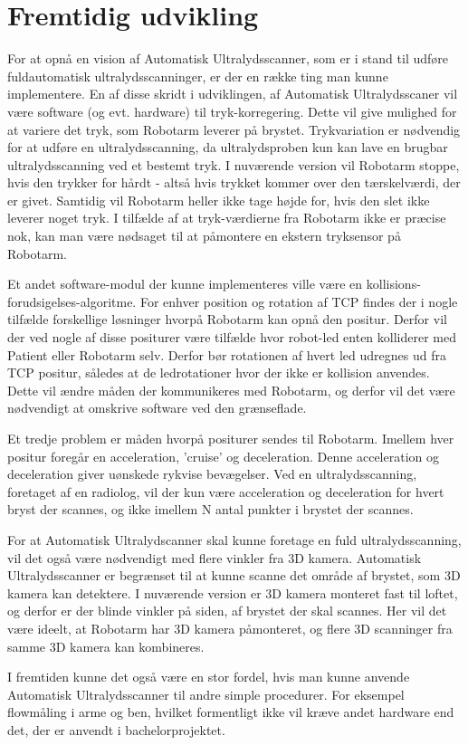 \chapter{Fremtidig udvikling}\label{kapitel_Fremtidig udvikling}
For at opnå en vision af Automatisk Ultralydsscanner, som er i stand til udføre fuldautomatisk ultralydsscanninger, er der en række ting man kunne implementere.
En af disse skridt i udviklingen, af Automatisk Ultralydsscaner vil være software (og evt. hardware) til tryk-korregering. Dette vil give mulighed for at variere det tryk, som Robotarm leverer på brystet. Trykvariation er nødvendig for at udføre en ultralydsscanning, da ultralydsproben kun kan lave en brugbar ultralydsscanning ved et bestemt tryk. I nuværende version vil Robotarm stoppe, hvis den trykker for hårdt - altså hvis trykket kommer over den tærskelværdi, der er givet. Samtidig vil Robotarm heller ikke tage højde for, hvis den slet ikke leverer noget tryk. I tilfælde af at tryk-værdierne fra Robotarm ikke er præcise nok, kan man være nødsaget til at påmontere en ekstern tryksensor på Robotarm.

Et andet software-modul der kunne implementeres ville være en kollisions-forudsigelses-algoritme. For enhver position og rotation af TCP findes der i nogle tilfælde forskellige løsninger hvorpå Robotarm kan opnå den positur. Derfor vil der ved nogle af disse positurer være tilfælde hvor robot-led enten kolliderer med Patient eller Robotarm selv. Derfor bør rotationen af hvert led udregnes ud fra TCP positur, således at de ledrotationer hvor der ikke er kollision anvendes. Dette vil ændre måden der kommunikeres med Robotarm, og derfor vil det være nødvendigt at omskrive software ved den grænseflade.

Et tredje problem er måden hvorpå positurer sendes til Robotarm. Imellem hver positur foregår en acceleration, 'cruise' og deceleration. Denne acceleration og deceleration giver uønskede rykvise bevægelser. Ved en ultralydsscanning, foretaget af en radiolog, vil der kun være acceleration og deceleration for hvert bryst der scannes, og ikke imellem N antal punkter i brystet der scannes.

For at Automatisk Ultralydscanner skal kunne foretage en fuld ultralydsscanning, vil det også være nødvendigt med flere vinkler fra 3D kamera. Automatisk Ultralydsscanner er begrænset til at kunne scanne det område af brystet, som 3D kamera kan detektere. I nuværende version er 3D kamera monteret fast til loftet, og derfor er der blinde vinkler på siden, af brystet der skal scannes. Her vil det være ideelt, at Robotarm har 3D kamera påmonteret, og flere 3D scanninger fra samme 3D kamera kan kombineres.

I fremtiden kunne det også være en stor fordel, hvis man kunne anvende Automatisk Ultralydsscanner til andre simple procedurer. For eksempel flowmåling i arme og ben, hvilket formentligt ikke vil kræve andet hardware end det, der er anvendt i bachelorprojektet.